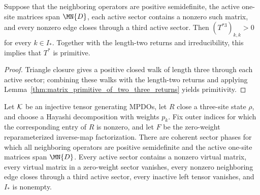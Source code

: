 \begin{lemma}%
    \label{thm:mpdo_active_sector_three_step_return_and_primitivity}
    \leanok
    Suppose that the neighboring operators are positive semidefinite, the
    active one-site matrices span $\MN{D}$, each active sector contains a
    nonzero such matrix, and every nonzero edge closes through a third active
    sector. Then $(T^{*3})_{k,k}>0$ for every $k\in I_*$. Together with the
    length-two returns and irreducibility, this implies that $T^*$ is
    primitive.
\end{lemma}

\begin{proof}
    \leanok
    Triangle closure gives a positive closed walk of length three through
    each active sector; combining these walks with the length-two returns and
    applying Lemma~\ref{thm:matrix_primitive_of_two_three_returns} yields
    primitivity.
\end{proof}

\begin{lemma}
    \label{thm:mpdo_inverse_map_active_sector_witnesses}
    \leanok
    Let ${\cal K}$ be an injective tensor generating MPDOs, let $R$ close a
    three-site state $\rho$, and choose a Hayashi decomposition with weights
    $p_k$. Fix outer indices
    for which the corresponding entry of $R$ is nonzero, and let $F$ be the
    zero-weight reparameterized inverse-map factorization. There are coherent
    sector phases for which all neighboring operators are positive semidefinite
    and the active one-site matrices span $\MN{D}$. Every active sector contains
    a nonzero virtual matrix, every virtual matrix in a zero-weight sector
    vanishes, every nonzero neighboring edge closes through a third active
    sector, every inactive left tensor vanishes, and $I_*$ is nonempty.
\end{lemma}

